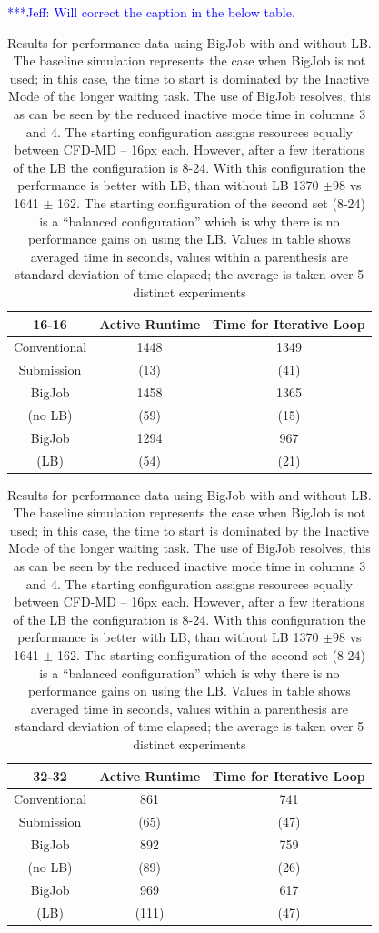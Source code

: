 \documentclass[conference,final]{IEEEtran}
\newcommand{\skonote}[1]{ {\textcolor{blue} { ***Jeff: #1 }}}
\newcommand{\skonote}[1]{}
\begin{document}
\skonote{Will correct the caption in the below table.}

\setlength{\tabcolsep}{1pt}
\begin{table}[!ht]
\begin{center}
 \caption{\small Results for performance data using BigJob with and
    without LB. The baseline simulation represents the case when
    BigJob is not used; in this case, the time to start is dominated
    by the Inactive Mode of the longer waiting task. The use of BigJob
    resolves, this as can be seen by the reduced inactive mode time in
    columns 3 and 4. The starting configuration assigns resources
    equally between CFD-MD -- 16px each. However, after a few
    iterations of the LB the configuration is 8-24. With this
    configuration the performance is better with LB, than without
    LB 1370 $\pm 98$ vs 1641 $\pm$ 162. The starting configuration
    of the second set (8-24) is a ``balanced configuration'' which is
    why there is no performance gains on using the LB. Values in table
    shows averaged time in seconds, values within a parenthesis are
    standard deviation of time elapsed; the average is taken over 5
    distinct experiments}
\label{table:oneBJ_Test}

\begin{tabular}{ c|| c | c }

\hline
16-16 & Active Runtime & Time for Iterative Loop \\
\hline
\hline
Conventional & 1448    & 1349 \\
Submission   & (13)    & (41) \\
\hline
BigJob     & 1458    & 1365 \\
(no LB)    & (59)  & (15)\\
\hline
BigJob     & 1294    & 967 \\
(LB)    & (54)  & (21) \\
\hline
\hline
\end{tabular}


\begin{tabular}{ c|| c | c }
\hline
\hline
32-32 & Active Runtime & Time for Iterative Loop \\
\hline
\hline
Conventional & 861    & 741 \\
Submission   & (65)    & (47) \\
\hline
BigJob     & 892    & 759 \\
(no LB)    & (89)  & (26)\\
\hline
BigJob     & 969    & 617 \\
(LB)    & (111)  & (47) \\
\hline

\end{tabular}
\end{center}
\end{table}
\end{document}
